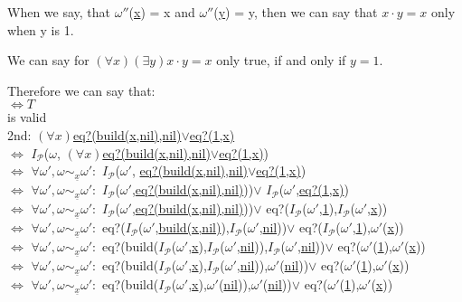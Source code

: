 \documentclass[10pt, a4paper]{article}
\newcommand{\InterP}{$I_{\mathcal{P}}$}
\newcommand{\unl}[1]{\underline{#1}}
\begin{document}
When we say, that $\omega''$(\unl{x}) = x and $\omega''$(\unl{y}) = y, then we can say that $x\cdot y=x$ only when y is 1.

We can say for $(\forall x)(\exists y) x \cdot y = x$ only true, if and only if $y = 1$.

Therefore we can say that: \\
$\iff T$ \\
is valid \\

2nd: \unl{$(\forall x)$eq?(build(x,nil),nil)$\lor$eq?(1,x)} \vspace{12pt} \\
$\iff$ \InterP($\omega$, \unl{$(\forall x)$eq?(build(x,nil),nil)$\lor$eq?(1,x)}) \vspace{2pt} \\
$\iff$ $\forall \omega',\omega \sim_{\unl{x}} \omega' :$ \InterP($\omega'$, \unl{eq?(build(x,nil),nil)$\lor$eq?(1,x)}) \vspace{2pt} \\
$\iff$ $\forall \omega',\omega \sim_{\unl{x}} \omega' :$ \InterP($\omega'$,\unl{eq?(build(x,nil),nil)}))$\lor$ \InterP($\omega'$,\unl{eq?(1,x)}) \vspace{2pt} \\
$\iff$ $\forall \omega',\omega \sim_{\unl{x}} \omega' :$ \InterP($\omega'$,\unl{eq?(build(x,nil),nil)}))$\lor$ eq?(\InterP($\omega'$,\unl{1}),\InterP($\omega'$,\unl{x})) \vspace{2pt} \\
$\iff$ $\forall \omega',\omega \sim_{\unl{x}} \omega' :$ eq?(\InterP($\omega'$,\unl{build(x,nil)}),\InterP($\omega'$,\unl{nil}))$\lor$ eq?(\InterP($\omega'$,\unl{1}),$\omega'$(\unl{x})) \vspace{2pt} \\
$\iff$ $\forall \omega',\omega \sim_{\unl{x}} \omega' :$ eq?(build(\InterP($\omega'$,\unl{x}),\InterP($\omega'$,\unl{nil})),\InterP($\omega'$,\unl{nil}))$\lor$ eq?($\omega'$(\unl{1}),$\omega'$(\unl{x})) \vspace{2pt}  \\
$\iff$ $\forall \omega',\omega \sim_{\unl{x}} \omega' :$ eq?(build(\InterP($\omega'$,\unl{x}),\InterP($\omega'$,\unl{nil})),$\omega'$(\unl{nil}))$\lor$ eq?($\omega'$(\unl{1}),$\omega'$(\unl{x})) \vspace{2pt} \\
$\iff$ $\forall \omega',\omega \sim_{\unl{x}} \omega' :$ eq?(build(\InterP($\omega'$,\unl{x}),$\omega'$(\unl{nil})),$\omega'$(\unl{nil}))$\lor$ eq?($\omega'$(\unl{1}),$\omega'$(\unl{x})) \vspace{2pt} \\
\end{document}
